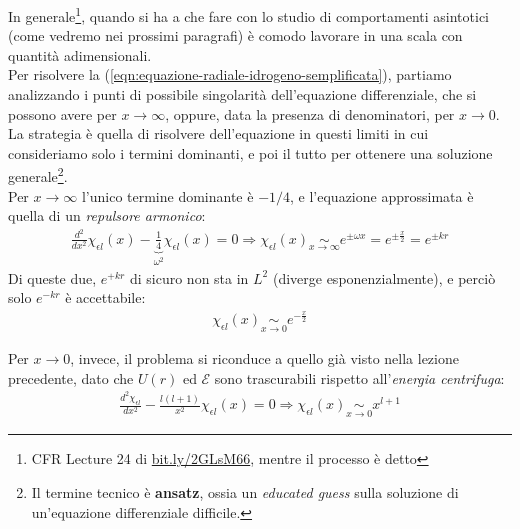 \documentclass[../../FisicaTeorica.tex]{subfiles}
\begin{document}
In generale\footnote{CFR Lecture 24 di \url{bit.ly/2GLsM66}, mentre il processo è detto }, quando si ha a che fare con lo studio di comportamenti asintotici (come vedremo nei prossimi paragrafi) è comodo lavorare in una scala  con quantità adimensionali.\\ %
Per risolvere la (\ref{eqn:equazione-radiale-idrogeno-semplificata}), partiamo analizzando i punti di possibile singolarità dell'equazione differenziale, che si possono avere per $x\to \infty$, oppure, data la presenza di denominatori, per $x\to 0$. La strategia è quella di risolvere  dell'equazione in questi limiti in cui consideriamo solo i termini dominanti, e poi  il tutto per ottenere una soluzione generale\footnote{Il termine tecnico è \textbf{ansatz}, ossia un \textit{educated guess} sulla soluzione di un'equazione differenziale difficile.}.\\

Per $x\to \infty$ l'unico termine dominante è $-1/4$, e l'equazione approssimata è quella di un \textit{repulsore armonico}:
\begin{align*}
\frac{d^2}{dx^2}\chi_{\epsilon l}(x) - \underbrace{\frac{1}{4}}_{\omega^2}\chi_{\epsilon l}(x) = 0 \Rightarrow  \chi_{\epsilon l}(x) \underset{x \to \infty}{\sim} e^{\pm\omega x} = e^{\pm\frac{x}{2}} = e^{\pm kr}
\end{align*}
Di queste due, $e^{+kr}$ di sicuro non sta in $L^2$ (diverge esponenzialmente), e perciò solo $e^{-kr}$ è accettabile:
\begin{align*}
\chi_{\epsilon l}(x) \underset{x \to 0}{\sim} e^{-\frac{x}{2}}
\end{align*}

Per $x\to 0$, invece, il problema si riconduce a quello già visto nella lezione precedente, dato che $U(r)$ ed $\mathcal{E}$ sono trascurabili rispetto all'\textit{energia centrifuga}:
\begin{align*}
\frac{d^2 \chi_{\epsilon l}}{dx^2} - \frac{l(l+1)}{x^2}\chi_{\epsilon l} (x) = 0 \Rightarrow  \chi_{\epsilon l}(x) \underset{x\to 0}{\sim} x^{l+1}
\end{align*}
\end{document}
